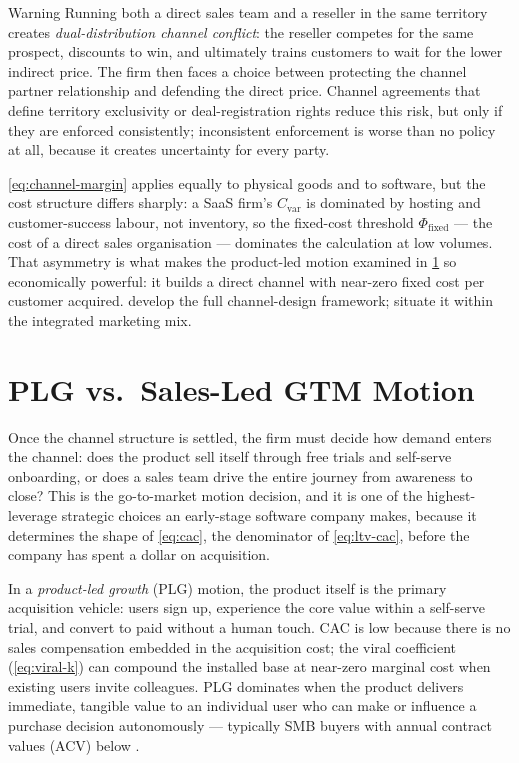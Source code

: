 \begin{admonition}{Warning}
Running both a direct sales team and a reseller in the same territory creates
\textit{dual-distribution channel conflict}: the reseller competes for the same prospect,
discounts to win, and ultimately trains customers to wait for the lower indirect price. The
firm then faces a choice between protecting the channel partner relationship and defending
the direct price. Channel agreements that define territory exclusivity or deal-registration
rights reduce this risk, but only if they are enforced consistently; inconsistent enforcement
is worse than no policy at all, because it creates uncertainty for every party.
\end{admonition}

\cref{eq:channel-margin} applies equally to physical goods and to software, but the
cost structure differs sharply: a SaaS firm's \(C_{\text{var}}\) is dominated by hosting
and customer-success labour, not inventory, so the fixed-cost threshold
\(\Phi_{\text{fixed}}\) --- the cost of a direct sales organisation --- dominates the
calculation at low volumes. That asymmetry is what makes the product-led motion examined in
\cref{sec:gtm-motion} so economically powerful: it builds a direct channel with near-zero
fixed cost per customer acquired. \textcite{coughlan2006marketing} develop the full
channel-design framework; \textcite{kotler2021} situate it within the integrated marketing mix.


\section{PLG vs.\ Sales-Led GTM Motion}\label{sec:gtm-motion}

Once the channel structure is settled, the firm must decide how demand enters the channel:
does the product sell itself through free trials and self-serve onboarding, or does a sales
team drive the entire journey from awareness to close? This is the go-to-market motion
decision, and it is one of the highest-leverage strategic choices an early-stage software
company makes, because it determines the shape of \cref{eq:cac}, the denominator of
\cref{eq:ltv-cac}, before the company has spent a dollar on acquisition.

In a \textit{product-led growth} (PLG) motion, the product itself is the primary acquisition
vehicle: users sign up, experience the core value within a self-serve trial, and convert to
paid without a human touch. CAC is low because there is no sales compensation embedded in
the acquisition cost; the viral coefficient (\cref{eq:viral-k}) can compound
the installed base at near-zero marginal cost when existing users invite colleagues. PLG
dominates when the product delivers immediate, tangible value to an individual user who can
make or influence a purchase decision autonomously --- typically SMB buyers with annual
contract values (ACV) below .

